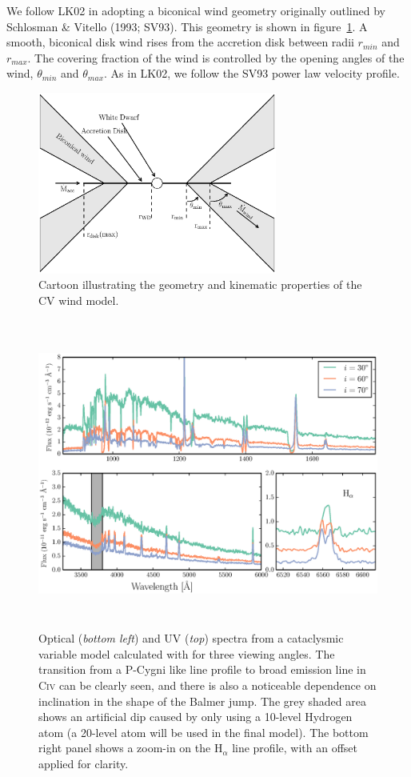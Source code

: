 \documentclass[useAMS,usenatbib,onecolumn]{mn2e2}
\begin{document}
We follow LK02 in adopting a biconical wind geometry originally outlined by Schlosman \& Vitello (1993; SV93\nocite{SV93}).
This geometry is shown in figure~\ref{cartoon}. 
A smooth, biconical disk wind rises from the accretion disk between radii $r_{min}$ and $r_{max}$. 
The covering fraction of the wind is controlled by the opening angles of the wind, $\theta_{min}$ and 
$\theta_{max}$. As in LK02, we follow the SV93 power law velocity profile. 

\begin{figure}
\centering
\includegraphics[width=0.7\textwidth]{figures/fig1.eps}
\caption{Cartoon illustrating the geometry and kinematic properties of the CV wind model.}
\label{cartoon}
\end{figure}



\begin{figure}
\centering
\includegraphics[width=\textwidth, height=4in, clip=true, trim=50 5 50 0]{figures/plot_combined1.eps}
\caption{Optical ({\sl bottom left}) and UV ({\sl top}) spectra from a cataclysmic variable model 
calculated with \py for three viewing angles.
The transition from a P-Cygni like line profile to broad emission line in C\textsc{iv} can be clearly seen, and there is also a noticeable dependence on inclination in the shape of the Balmer jump. The grey shaded area shows an artificial dip caused by only using a 10-level Hydrogen atom (a 20-level atom will be used in the final model). The bottom right panel shows a zoom-in on the H$_\alpha$ line profile, with an offset applied for clarity.}
\label{spec}
\end{figure}
\end{document}
